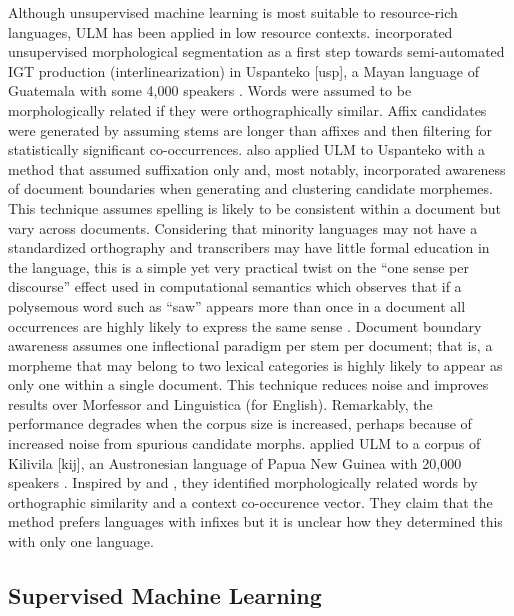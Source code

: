 \documentclass[12pt]{article}
\begin{document}
Although unsupervised machine learning is most suitable to resource-rich languages, ULM has been applied in low resource contexts.  incorporated unsupervised morphological segmentation as a first step towards semi-automated IGT production (interlinearization) in Uspanteko [usp], a Mayan language of Guatemala with some 4,000 speakers \cite{simons_ethnologue:_2018}. Words were assumed to be morphologically related if they were orthographically similar. Affix candidates were generated by assuming stems are longer than affixes and then filtering for statistically significant co-occurrences.  also applied ULM to Uspanteko with a method that assumed suffixation only and, most notably, incorporated awareness of document boundaries when generating and clustering candidate morphemes. This technique assumes spelling is likely to be consistent within a document but vary across documents. Considering that minority languages may not have a standardized orthography and transcribers may have little formal education in the language, this is a simple yet very practical twist on the “one sense per discourse” effect used in computational semantics which observes that if a polysemous word such as ``saw'' appears more than once in a document all occurrences are highly likely to express the same sense \cite{gale_one_1992}. Document boundary awareness assumes one inflectional paradigm per stem per document; that is, a morpheme that may belong to two lexical categories is highly likely to appear as only one within a single document. This technique reduces noise and improves results over Morfessor and Linguistica (for English). Remarkably, the performance degrades when the corpus size is increased, perhaps because of increased noise from spurious candidate morphs.  applied ULM to a corpus of Kilivila [kij], an Austronesian language of Papua New Guinea with 20,000 speakers \cite{simons_ethnologue:_2018}. Inspired by  and , they identified morphologically related words by orthographic similarity and a context co-occurence vector. They claim that the method prefers languages with infixes but it is unclear how they determined this with only one language. 

\subsection{Supervised Machine Learning}
\end{document}
